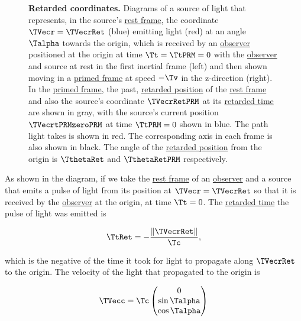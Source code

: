 \begin{figure}[ht]
	\caption{\textbf{Retarded coordinates.} Diagrams of a source of light that represents, in the source's \protect\hyperlink{def-proper-frame}{rest frame}, the coordinate ${\TVecr  } = {\TVecrRet  }$ (blue) emitting light (red) at an angle ${\Talpha }$ towards the origin, which is received by an \protect\hyperlink{def-observer}{observer} positioned at the origin at time ${\Tt } = \TtPRM  = 0$ with the \protect\hyperlink{def-observer}{observer} and source at rest in the first inertial frame (left) and then shown moving in a \protect\hyperlink{def-Primed-Frame}{primed frame} at speed $-{\Tv }$ in the z-direction (right). In the \protect\hyperlink{def-Primed-Frame}{primed frame}, the past, \protect\hyperlink{def-retarded-position}{retarded position} of the \protect\hyperlink{def-proper-frame}{rest frame} and also the source's coordinate ${\TVecrRetPRM  }$ at its \protect\hyperlink{def-retarded-time}{retarded time} are shown in gray, with the source's current position $\TVecrtPRMzeroPRM $ at time $\TtPRM =0$ shown in blue. The path light takes is shown in red. The corresponding axis in each frame is also shown in black. The angle of the \protect\hyperlink{def-retarded-position}{retarded position} from the origin is ${\TthetaRet  }$ and ${\TthetaRetPRM  }$ respectively.}
	\label{fig: Retarded field}
\end{figure}

As shown in the diagram, if we take the \hyperlink{def-proper-frame}{rest frame} of an \hyperlink{def-observer}{observer} and a source that emits a pulse of light from its position at ${\TVecr =\TVecrRet }$ so that it is received by the \hyperlink{def-observer}{observer} at the origin, at time ${\Tt } = 0$.
The \hyperlink{def-retarded-time}{retarded time} the pulse of light was emitted is

\begin{equation}
	{ \TtRet  } =-\frac{\|\TVecrRet \|}{\Tc },
\end{equation}

which is the negative of the time it took for light to propagate along ${\TVecrRet }$ to the origin.
The velocity of the light that propagated to the origin is

\begin{equation}
	\TVecc  = {\Tc }
	\begin{pmatrix}
		0            \\
		\sin{\Talpha } \\
		\cos{\Talpha } \\
	\end{pmatrix}
\end{equation}

